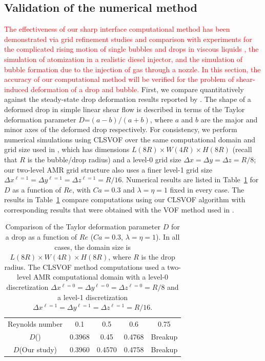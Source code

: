 \documentclass{elsarticle}
\newcommand{\lwh}[3]{L(#1R)\times W(#2R) \times H(#3R)}
\begin{document}
\subsection{Validation of the numerical method}
\textcolor{red}
{
	The effectiveness of our sharp interface computational method has been demonstrated via grid refinement studies and comparison with experiments for the complicated rising motion of single bubbles and drops in viscous liquids \citet{OhtSus12, OhtAkaYosSus14, OhtFurYosSus19,ohta2010sensitivity,stewart2008improved,SusSmiHusOhtZhi07}, the simulation of atomization in a realistic diesel injector\cite{arienti2013coupled}, and the simulation of bubble formation due to the injection of gas through a nozzle\cite{ohta2011robust}.  In this section, the accuracy of our computational method will be verified for the problem of shear-induced deformation of a drop and bubble. 
}
First, we compare quantitatively against the steady-state drop deformation results reported by \citet{LiRenRen00}.  The shape of a deformed drop in simple linear shear flow is described in terms of the Taylor deformation parameter $D$=$(a-b)/(a+b)$, where $a$ and $b$ are the major and minor axes of the deformed drop respectively.  For consistency, we perform numerical simulations using CLSVOF over the same computational domain and grid size used in \citet{LiRenRen00}, which has dimensions $\lwh{8}{4}{8}$ (recall that $R$ is the bubble/drop radius) and a level-0 grid size $\Delta x=\Delta y=\Delta z=R/8$; our two-level AMR grid structure also uses a finer level-1 grid size $\Delta x^{\ell=1} = \Delta y^{\ell=1} = \Delta z^{\ell=1} = R/16$.  Numerical results are listed in Table~\ref{tab:DeComparison} for $D$ as a function of $Re$, with $Ca=0.3$ and $\lambda = \eta = 1$ fixed in every case.  The results in Table~\ref{tab:DeComparison} compare computations using our CLSVOF algorithm with corresponding results that were obtained with the VOF method used in \citet{LiRenRen00}.  
%
\begin{table}[tbh]
\caption{Comparison of the Taylor deformation parameter $D$ for a drop as a function of $Re$ ($Ca=0.3$, $\lambda = \eta = 1$). In all cases, the domain size is $\lwh{8}{4}{8}$, where $R$ is the drop radius.  The CLSVOF method computations used a two-level AMR computational domain with a level-0 discretization $\Delta x^{\ell=0} = \Delta y^{\ell=0} = \Delta z^{\ell=0} = R/8$ and a level-1 discretization $\Delta x^{\ell=1} = \Delta y^{\ell=1} = \Delta z^{\ell=1} = R/16$.}
\label{tab:DeComparison}
\center
\begin{tabular}{ c  c  c  c  c }
\hline
\hline
Reynolds number                      & 0.1     & 0.5     & 0.6     & 0.75      \\
$D$(\citet{LiRenRen00})  & 0.3968  & 0.45    & 0.4768  & Breakup   \\
$D$(Our study) & 0.3960  & 0.4570  & 0.4758  & Breakup   \\
\hline
\hline
\end{tabular}
\end{table}
\end{document}
